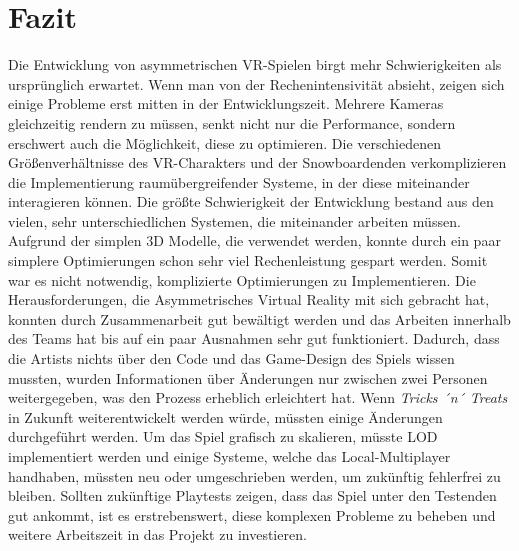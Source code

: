 \chapter{Fazit}
Die Entwicklung von asymmetrischen VR-Spielen birgt mehr Schwierigkeiten als ursprünglich erwartet. Wenn man von der Rechenintensivität absieht, zeigen sich einige Probleme erst mitten in der Entwicklungszeit. Mehrere Kameras gleichzeitig rendern zu müssen, senkt nicht nur die Performance, sondern erschwert auch die Möglichkeit, diese zu optimieren. Die verschiedenen Größenverhältnisse des VR-Charakters und der Snowboardenden verkomplizieren die Implementierung raumübergreifender Systeme, in der diese miteinander interagieren können. Die größte Schwierigkeit der Entwicklung bestand aus den vielen, sehr unterschiedlichen Systemen, die miteinander arbeiten müssen. Aufgrund der simplen 3D Modelle, die verwendet werden, konnte durch ein paar simplere Optimierungen schon sehr viel Rechenleistung gespart werden. Somit war es nicht notwendig, komplizierte Optimierungen zu Implementieren. Die Herausforderungen, die Asymmetrisches Virtual Reality mit sich gebracht hat, konnten durch Zusammenarbeit gut bewältigt werden und das Arbeiten innerhalb des Teams hat bis auf ein paar Ausnahmen sehr gut funktioniert. Dadurch, dass die Artists nichts über den Code und das Game-Design des Spiels wissen mussten, wurden Informationen über Änderungen nur zwischen zwei Personen weitergegeben, was den Prozess erheblich erleichtert hat. Wenn \emph{Tricks ´n´ Treats} in Zukunft weiterentwickelt werden würde, müssten einige Änderungen durchgeführt werden. Um das Spiel grafisch zu skalieren, müsste LOD implementiert werden und einige Systeme, welche das Local-Multiplayer handhaben, müssten neu oder umgeschrieben werden, um zukünftig fehlerfrei zu bleiben. Sollten zukünftige Playtests zeigen, dass das Spiel unter den Testenden gut ankommt, ist es erstrebenswert, diese komplexen Probleme zu beheben und weitere Arbeitszeit in das Projekt zu investieren.
